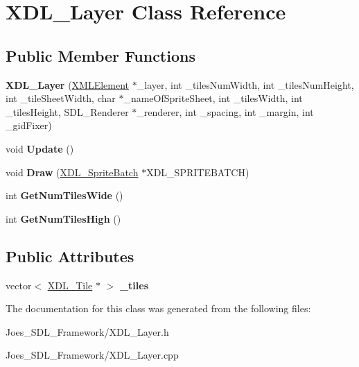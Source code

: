 \hypertarget{class_x_d_l___layer}{\section{X\-D\-L\-\_\-\-Layer Class Reference}
\label{class_x_d_l___layer}
}
\subsection*{Public Member Functions}
\begin{DoxyCompactItemize}
\item 
\hypertarget{class_x_d_l___layer_a927d3a9c6890e17bb59ab45dee6dbb70}{{\bfseries X\-D\-L\-\_\-\-Layer} (\hyperlink{classtinyxml2_1_1_x_m_l_element}{X\-M\-L\-Element} $\ast$\-\_\-layer, int \-\_\-tiles\-Num\-Width, int \-\_\-tiles\-Num\-Height, int \-\_\-tile\-Sheet\-Width, char $\ast$\-\_\-name\-Of\-Sprite\-Sheet, int \-\_\-tiles\-Width, int \-\_\-tiles\-Height, S\-D\-L\-\_\-\-Renderer $\ast$\-\_\-renderer, int \-\_\-spacing, int \-\_\-margin, int \-\_\-gid\-Fixer)}\label{class_x_d_l___layer_a927d3a9c6890e17bb59ab45dee6dbb70}

\item 
\hypertarget{class_x_d_l___layer_af72c722f3272b6b7c1880c73747608ff}{void {\bfseries Update} ()}\label{class_x_d_l___layer_af72c722f3272b6b7c1880c73747608ff}

\item 
\hypertarget{class_x_d_l___layer_a18e206f189cd89981380e912b25737e2}{void {\bfseries Draw} (\hyperlink{class_x_d_l___sprite_batch}{X\-D\-L\-\_\-\-Sprite\-Batch} $\ast$X\-D\-L\-\_\-\-S\-P\-R\-I\-T\-E\-B\-A\-T\-C\-H)}\label{class_x_d_l___layer_a18e206f189cd89981380e912b25737e2}

\item 
\hypertarget{class_x_d_l___layer_a05d453ae2900d1cdfab2f7357d78d769}{int {\bfseries Get\-Num\-Tiles\-Wide} ()}\label{class_x_d_l___layer_a05d453ae2900d1cdfab2f7357d78d769}

\item 
\hypertarget{class_x_d_l___layer_a65bab3b436d6abdf8758f5ab9f2fc6b2}{int {\bfseries Get\-Num\-Tiles\-High} ()}\label{class_x_d_l___layer_a65bab3b436d6abdf8758f5ab9f2fc6b2}

\end{DoxyCompactItemize}
\subsection*{Public Attributes}
\begin{DoxyCompactItemize}
\item 
\hypertarget{class_x_d_l___layer_a7c56eae3df1548d3ab7a63128153c3ed}{vector$<$ \hyperlink{class_x_d_l___tile}{X\-D\-L\-\_\-\-Tile} $\ast$ $>$ {\bfseries \-\_\-tiles}}\label{class_x_d_l___layer_a7c56eae3df1548d3ab7a63128153c3ed}

\end{DoxyCompactItemize}


The documentation for this class was generated from the following files\-:\begin{DoxyCompactItemize}
\item 
Joes\-\_\-\-S\-D\-L\-\_\-\-Framework/X\-D\-L\-\_\-\-Layer.\-h\item 
Joes\-\_\-\-S\-D\-L\-\_\-\-Framework/X\-D\-L\-\_\-\-Layer.\-cpp\end{DoxyCompactItemize}
